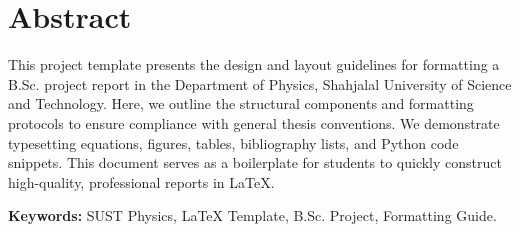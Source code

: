 
\chapter*{Abstract}


This project template presents the design and layout guidelines for formatting a B.Sc. project report in the Department of Physics, Shahjalal University of Science and Technology. Here, we outline the structural components and formatting protocols to ensure compliance with general thesis conventions. We demonstrate typesetting equations, figures, tables, bibliography lists, and Python code snippets. This document serves as a boilerplate for students to quickly construct high-quality, professional reports in LaTeX.

\vspace{0.2in}
\noindent
\textbf{Keywords:} SUST Physics, LaTeX Template, B.Sc. Project, Formatting Guide.
